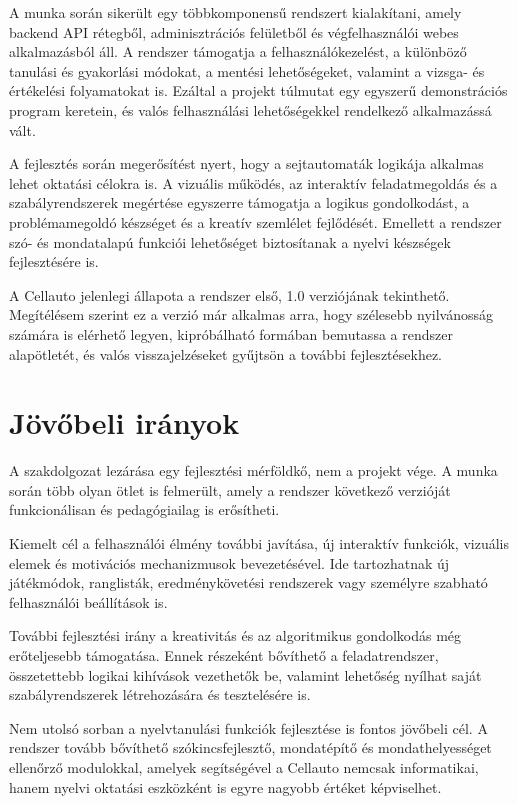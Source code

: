 \documentclass{thesis-ekf}
\begin{document}
A munka során sikerült egy többkomponensű rendszert kialakítani, amely backend API rétegből, adminisztrációs felületből és végfelhasználói webes alkalmazásból áll. A rendszer támogatja a felhasználókezelést, a különböző tanulási és gyakorlási módokat, a mentési lehetőségeket, valamint a vizsga- és értékelési folyamatokat is. Ezáltal a projekt túlmutat egy egyszerű demonstrációs program keretein, és valós felhasználási lehetőségekkel rendelkező alkalmazássá vált.

A fejlesztés során megerősítést nyert, hogy a sejtautomaták logikája alkalmas lehet oktatási célokra is. A vizuális működés, az interaktív feladatmegoldás és a szabályrendszerek megértése egyszerre támogatja a logikus gondolkodást, a problémamegoldó készséget és a kreatív szemlélet fejlődését. Emellett a rendszer szó- és mondatalapú funkciói lehetőséget biztosítanak a nyelvi készségek fejlesztésére is.

A Cellauto jelenlegi állapota a rendszer első, 1.0 verziójának tekinthető. Megítélésem szerint ez a verzió már alkalmas arra, hogy szélesebb nyilvánosság számára is elérhető legyen, kipróbálható formában bemutassa a rendszer alapötletét, és valós visszajelzéseket gyűjtsön a további fejlesztésekhez.

\section{Jövőbeli irányok}
A szakdolgozat lezárása egy fejlesztési mérföldkő, nem a projekt vége. A munka során több olyan ötlet is felmerült, amely a rendszer következő verzióját funkcionálisan és pedagógiailag is erősítheti.

Kiemelt cél a felhasználói élmény további javítása, új interaktív funkciók, vizuális elemek és motivációs mechanizmusok bevezetésével. Ide tartozhatnak új játékmódok, ranglisták, eredménykövetési rendszerek vagy személyre szabható felhasználói beállítások is.

További fejlesztési irány a kreativitás és az algoritmikus gondolkodás még erőteljesebb támogatása. Ennek részeként bővíthető a feladatrendszer, összetettebb logikai kihívások vezethetők be, valamint lehetőség nyílhat saját szabályrendszerek létrehozására és tesztelésére is.

Nem utolsó sorban a nyelvtanulási funkciók fejlesztése is fontos jövőbeli cél. A rendszer tovább bővíthető szókincsfejlesztő, mondatépítő és mondathelyességet ellenőrző modulokkal, amelyek segítségével a Cellauto nemcsak informatikai, hanem nyelvi oktatási eszközként is egyre nagyobb értéket képviselhet.
\end{document}
